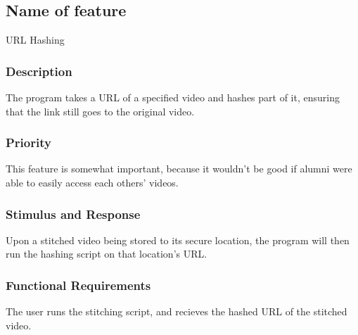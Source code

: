 \subsection{Name of feature}
URL Hashing
\subsubsection{Description}
The program takes a URL of a specified video and hashes part of it, ensuring that the link still goes to the original video.

\subsubsection{Priority}
This feature is somewhat important, because it wouldn't be good if alumni were able to easily access each others' videos.

\subsubsection{Stimulus and Response}
Upon a stitched video being stored to its secure location, the program will then run the hashing script on that location's URL.

\subsubsection{Functional Requirements}
The user runs the stitching script, and recieves the hashed URL of the stitched video.
